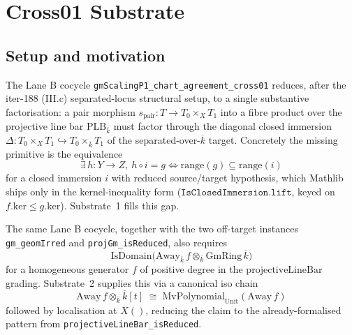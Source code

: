 \chapter{Cross01 Substrate}
\label{chap:Genus0BaseObjects_Cross01Substrate}

%

\section{Setup and motivation}
\label{sec:cross01_substrate_setup}

The Lane B cocycle \texttt{gmScalingP1\_chart\_agreement\_cross01} reduces, after
the iter-188 (III.c) separated-locus structural setup, to a single substantive
factorisation: a pair morphism
\(s_{\text{pair}} : T \to T_0 \times_X T_1\) into a fibre product over the
projective line bar \(\mathrm{PLB}_{\overline{k}}\) must factor through the
diagonal closed immersion
\(\Delta : T_0 \times_{X} T_1 \hookrightarrow T_0 \times_{\overline{k}} T_1\)
of the separated-over-\(\overline{k}\) target. Concretely the missing primitive is
the equivalence
\[
  \exists\, h : Y \to Z,\ h \circ i = g \iff \mathrm{range}(g) \subseteq \mathrm{range}(i)
\]
for a closed immersion \(i\) with reduced source/target hypothesis, which Mathlib
ships only in the kernel-inequality form (\(\mathtt{IsClosedImmersion.lift}\),
keyed on \(f.\mathrm{ker} \le g.\mathrm{ker}\)). Substrate~1 fills this gap.

The same Lane B cocycle, together with the two off-target instances
\texttt{gm\_geomIrred} and \texttt{projGm\_isReduced}, also requires
\[
  \mathrm{IsDomain}\bigl(\mathrm{Away}_{\overline{k}}\,f \otimes_{\overline{k}} \mathrm{GmRing}\,\overline{k}\bigr)
\]
for a homogeneous generator \(f\) of positive degree in the
\(\mathrm{projectiveLineBar}\) grading. Substrate~2 supplies this via a
canonical iso chain
\[
  \mathrm{Away}\,f \otimes_{\overline{k}} \overline{k}[t]
  \;\cong\; \mathrm{MvPolynomial}_{\mathrm{Unit}}(\mathrm{Away}\,f)
\]
followed by localisation at \(X()\), reducing the claim to the
already-formalised pattern from \texttt{projectiveLineBar\_isReduced}.

